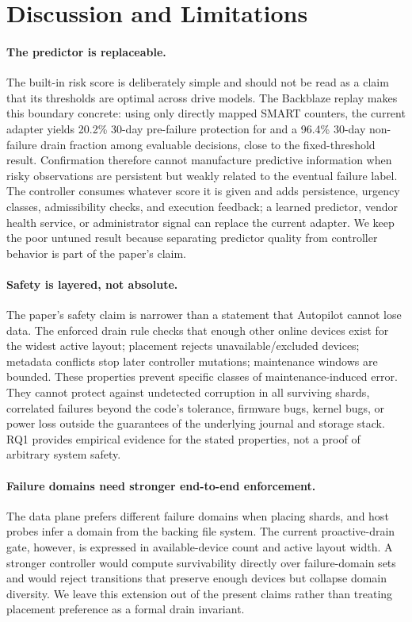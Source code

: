 \section{Discussion and Limitations}
\label{sec:discussion}

\paragraph{The predictor is replaceable.}
The built-in risk score is deliberately simple and should not be read as a claim that its thresholds are optimal across drive models. The Backblaze replay makes this boundary concrete: using only directly mapped SMART counters, the current adapter yields 20.2\% 30-day pre-failure protection for \autopilot{} and a 96.4\% 30-day non-failure drain fraction among evaluable decisions, close to the fixed-threshold result. Confirmation therefore cannot manufacture predictive information when risky observations are persistent but weakly related to the eventual failure label. The controller consumes whatever score it is given and adds persistence, urgency classes, admissibility checks, and execution feedback; a learned predictor, vendor health service, or administrator signal can replace the current adapter. We keep the poor untuned result because separating predictor quality from controller behavior is part of the paper's claim.

\paragraph{Safety is layered, not absolute.}
The paper's safety claim is narrower than a statement that Autopilot cannot lose data. The enforced drain rule checks that enough other online devices exist for the widest active layout; placement rejects unavailable/excluded devices; metadata conflicts stop later controller mutations; maintenance windows are bounded. These properties prevent specific classes of maintenance-induced error. They cannot protect against undetected corruption in all surviving shards, correlated failures beyond the code's tolerance, firmware bugs, kernel bugs, or power loss outside the guarantees of the underlying journal and storage stack. RQ1 provides empirical evidence for the stated properties, not a proof of arbitrary system safety.

\paragraph{Failure domains need stronger end-to-end enforcement.}
The data plane prefers different failure domains when placing shards, and host probes infer a domain from the backing file system. The current proactive-drain gate, however, is expressed in available-device count and active layout width. A stronger controller would compute survivability directly over failure-domain sets and would reject transitions that preserve enough devices but collapse domain diversity. We leave this extension out of the present claims rather than treating placement preference as a formal drain invariant.

